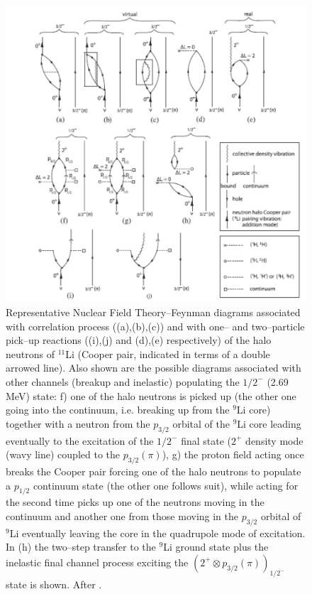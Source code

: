\begin{subappendices}
  \begin{figure}
  \centerline{\includegraphics*[width=12cm,angle=0]{C8/figsC8/fig8_B_1x}}
  	\caption{Representative Nuclear Field Theory--Feynman diagrams associated with correlation process ((a),(b),(c)) and with one-- and two--particle pick--up reactions ((i),(j) and (d),(e) respectively) of the halo neutrons of $^{11}$Li (Cooper pair, indicated in terms of a double arrowed line). Also shown are the possible diagrams associated with other channels (breakup and inelastic) populating the $1/2^-$ (2.69 MeV) state: f) one of the halo neutrons is picked up (the other one going into the continuum, i.e. breaking up from the $^9$Li core) together with a neutron from the $p_{3/2}$ orbital of the $^9$Li core  leading eventually to the excitation of the $1/2^-$ final state ($2^+$ density mode (wavy line) coupled to the $p_{3/2}(\pi)$), g) the proton field acting once breaks the Cooper pair forcing one of the halo neutrons to populate a $p_{1/2}$ continuum state (the other one follows suit), while acting for the second time picks up one of the neutrons moving in the continuum and another one from those moving in the $p_{3/2}$ orbital of $^9$Li eventually leaving the core in the quadrupole mode of excitation. In (h) the  two--step transfer to the $^9$Li ground state plus the inelastic final channel process exciting the $(2^+\otimes p_{3/2}(\pi))_{1/2^-}$ state is shown. After \cite{Potel:10}.}\label{fig8_B_1}
  \end{figure}

\end{subappendices}
